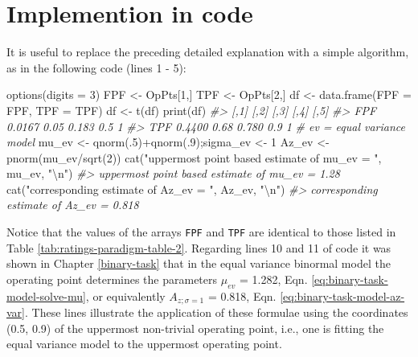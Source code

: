 \documentclass[
]{book}
\newenvironment{Shaded}{\begin{snugshade}}{\end{snugshade}}
\newcommand{\AttributeTok}[1]{\textcolor[rgb]{0.77,0.63,0.00}{#1}}
\newcommand{\CommentTok}[1]{\textcolor[rgb]{0.56,0.35,0.01}{\textit{#1}}}
\newcommand{\DecValTok}[1]{\textcolor[rgb]{0.00,0.00,0.81}{#1}}
\newcommand{\FunctionTok}[1]{\textcolor[rgb]{0.00,0.00,0.00}{#1}}
\newcommand{\NormalTok}[1]{#1}
\newcommand{\OtherTok}[1]{\textcolor[rgb]{0.56,0.35,0.01}{#1}}
\newcommand{\SpecialCharTok}[1]{\textcolor[rgb]{0.00,0.00,0.00}{#1}}
\newcommand{\StringTok}[1]{\textcolor[rgb]{0.31,0.60,0.02}{#1}}
\begin{document}
\hypertarget{ratings-task-code}{%
\section{Implemention in code}\label{ratings-task-code}}

It is useful to replace the preceding detailed explanation with a simple algorithm, as in the following code (lines 1 - 5):

\begin{Shaded}
\begin{Highlighting}[numbers=left,,]
\FunctionTok{options}\NormalTok{(}\AttributeTok{digits =} \DecValTok{3}\NormalTok{)}
\NormalTok{FPF }\OtherTok{\textless{}{-}}\NormalTok{ OpPts[}\DecValTok{1}\NormalTok{,]}
\NormalTok{TPF }\OtherTok{\textless{}{-}}\NormalTok{ OpPts[}\DecValTok{2}\NormalTok{,]}
\NormalTok{df }\OtherTok{\textless{}{-}} \FunctionTok{data.frame}\NormalTok{(}\AttributeTok{FPF =}\NormalTok{ FPF, }\AttributeTok{TPF =}\NormalTok{ TPF)}
\NormalTok{df }\OtherTok{\textless{}{-}} \FunctionTok{t}\NormalTok{(df)}
\FunctionTok{print}\NormalTok{(df)}
\CommentTok{\#\textgreater{}       [,1] [,2]  [,3] [,4] [,5]}
\CommentTok{\#\textgreater{} FPF 0.0167 0.05 0.183  0.5    1}
\CommentTok{\#\textgreater{} TPF 0.4400 0.68 0.780  0.9    1}
\CommentTok{\# ev = equal variance model}
\NormalTok{mu\_ev }\OtherTok{\textless{}{-}} \FunctionTok{qnorm}\NormalTok{(.}\DecValTok{5}\NormalTok{)}\SpecialCharTok{+}\FunctionTok{qnorm}\NormalTok{(.}\DecValTok{9}\NormalTok{);sigma\_ev }\OtherTok{\textless{}{-}} \DecValTok{1}
\NormalTok{Az\_ev }\OtherTok{\textless{}{-}} \FunctionTok{pnorm}\NormalTok{(mu\_ev}\SpecialCharTok{/}\FunctionTok{sqrt}\NormalTok{(}\DecValTok{2}\NormalTok{))}
\FunctionTok{cat}\NormalTok{(}\StringTok{"uppermost point based estimate of mu\_ev = "}\NormalTok{, mu\_ev, }\StringTok{"}\SpecialCharTok{\textbackslash{}n}\StringTok{"}\NormalTok{)}
\CommentTok{\#\textgreater{} uppermost point based estimate of mu\_ev =  1.28}
\FunctionTok{cat}\NormalTok{(}\StringTok{"corresponding estimate of Az\_ev = "}\NormalTok{, Az\_ev, }\StringTok{"}\SpecialCharTok{\textbackslash{}n}\StringTok{"}\NormalTok{)}
\CommentTok{\#\textgreater{} corresponding estimate of Az\_ev =  0.818}
\end{Highlighting}
\end{Shaded}

Notice that the values of the arrays \texttt{FPF} and \texttt{TPF} are identical to those listed in Table \ref{tab:ratings-paradigm-table-2}. Regarding lines 10 and 11 of code it was shown in Chapter \ref{binary-task} that in the equal variance binormal model the operating point determines the parameters \(\mu_{ev}\) = 1.282, Eqn. \eqref{eq:binary-task-model-solve-mu}, or equivalently \(A_{z;\sigma = 1}\) = 0.818, Eqn. \eqref{eq:binary-task-model-az-var}. These lines illustrate the application of these formulae using the coordinates (0.5, 0.9) of the uppermost non-trivial operating point, i.e., one is fitting the equal variance model to the uppermost operating point.
\end{document}
